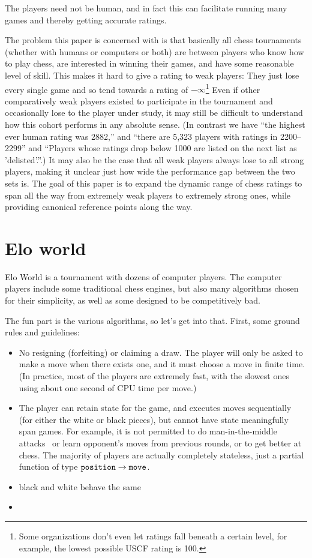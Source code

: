 \documentclass[numbers]{sigplanconf}
\begin{document}
The players need not be human, and in fact this can facilitate running
many games and thereby getting accurate ratings.

The problem this paper is concerned with is that basically all chess
tournaments (whether with humans or computers or both) are between
players who know how to play chess, are interested in winning their
games, and have some reasonable level of skill. This makes it hard to
give a rating to weak players: They just lose every single game and so
tend towards a rating of $-\infty$\footnote{Some organizations don't
  even let ratings fall beneath a certain level, for example, the
  lowest possible USCF rating is 100.} Even if other comparatively
weak players existed to participate in the tournament and occasionally
lose to the player under study, it may still be difficult to
understand how this cohort performs in any absolute sense. (In
contrast we have ``the highest ever human rating was 2882,'' and
``there are 5,323 players with ratings in 2200--2299'' and ``Players
whose ratings drop below 1000 are listed on the next list as
'delisted'.''\cite{fideratings}.) It may also be the case that all
weak players always lose to all strong players, making it unclear just
how wide the performance gap between the two sets is. The goal of
this paper is to expand the dynamic range of chess ratings to span
all the way from extremely weak players to extremely strong ones, while
providing canonical reference points along the way.

\section{Elo world}

Elo World is a tournament with dozens of computer players. The
computer players include some traditional chess engines, but also many
algorithms chosen for their simplicity, as well as some designed to
be competitively bad.

The fun part is the various algorithms, so let's get into that. First,
some ground rules and guidelines:
\begin{itemize}
\item No resigning (forfeiting) or claiming a draw. The player will
  only be asked to make a move when there exists one, and it must
  choose a move in finite time. (In practice, most of the players are
  extremely fast, with the slowest ones using about one second of
  CPU time per move.)
\item The player can retain state for the game, and executes moves
  sequentially (for either the white or black pieces), but cannot have
  state meaningfully span games. For example, it is not permitted to
  do man-in-the-middle attacks~\cite{blind} or learn opponent's moves
  from previous rounds, or to get better at chess. The majority of
  players are actually completely stateless, just a partial function
  of type ${\tt position} \rightarrow {\tt move}$.
\item black and white behave the same
\item 
\end{itemize}
\end{document}
